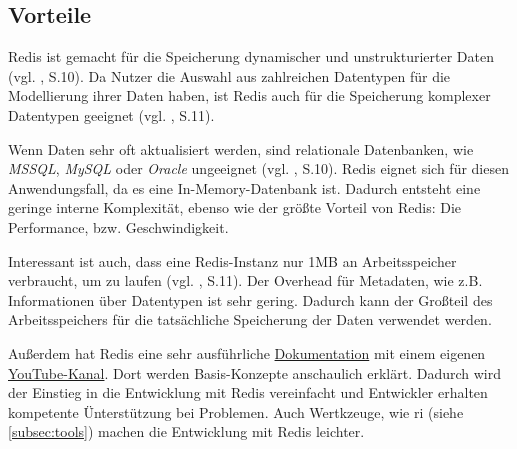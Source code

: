 
\subsection{Vorteile}

\ac{Redis} ist gemacht für die Speicherung dynamischer und unstrukturierter Daten (vgl. \cite{4}, S.10). Da Nutzer die Auswahl aus zahlreichen Datentypen für die Modellierung ihrer Daten haben, ist \ac{Redis} auch für die Speicherung komplexer Datentypen geeignet (vgl. \cite{4}, S.11).

Wenn Daten sehr oft aktualisiert werden, sind relationale Datenbanken, wie \textit{MSSQL}, \textit{MySQL} oder \textit{Oracle} ungeeignet (vgl. \cite{4}, S.10). \acs{Redis} eignet sich für diesen Anwendungsfall, da es eine In-Memory-Datenbank ist. Dadurch entsteht eine geringe interne Komplexität, ebenso wie der größte Vorteil von \acs{Redis}: Die Performance, bzw. Geschwindigkeit.

Interessant ist auch, dass eine \acs{Redis}-Instanz nur 1MB an Arbeitsspeicher verbraucht, um zu laufen (vgl. \cite{4}, S.11). Der Overhead für Metadaten, wie z.B. Informationen über Datentypen ist sehr gering. Dadurch kann der Großteil des Arbeitsspeichers für die tatsächliche Speicherung der Daten verwendet werden.

Außerdem hat \acs{Redis} eine sehr ausführliche \href{https://redis.io/docs/}{Dokumentation} mit einem eigenen \href{https://www.youtube.com/@Redisinc}{YouTube-Kanal}. Dort werden Basis-Konzepte anschaulich erklärt. Dadurch wird der Einstieg in die Entwicklung mit \acs{Redis} vereinfacht und Entwickler erhalten kompetente Ünterstützung bei Problemen. Auch Wertkzeuge, wie \gls{ri} (siehe \autoref{subsec:tools}) machen die Entwicklung mit \acs{Redis} leichter.